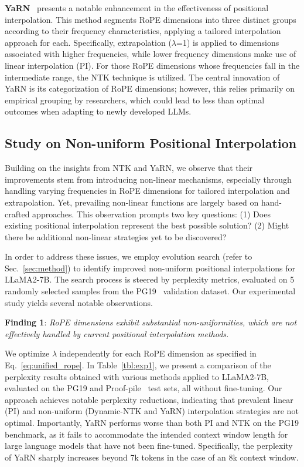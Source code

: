 \textbf{YaRN}~\cite{yarn} presents a notable enhancement in the effectiveness of positional interpolation. This method segments RoPE dimensions into three distinct groups according to their frequency characteristics, applying a tailored interpolation approach for each. Specifically, extrapolation ($\lambda$=1) is applied to dimensions associated with higher frequencies, while lower frequency dimensions make use of linear interpolation (PI). For those RoPE dimensions whose frequencies fall in the intermediate range, the NTK technique is utilized. The central innovation of YaRN is its categorization of RoPE dimensions; however, this relies primarily on empirical grouping by researchers, which could lead to less than optimal outcomes when adapting to newly developed LLMs.

\subsection{Study on Non-uniform Positional Interpolation}

Building on the insights from NTK and YaRN, we observe that their improvements stem from introducing non-linear mechanisms, especially through handling varying frequencies in RoPE dimensions for tailored interpolation and extrapolation. Yet, prevailing non-linear functions are largely based on hand-crafted approaches. This observation prompts two key questions: (1) Does existing positional interpolation represent the best possible solution? (2) Might there be additional non-linear strategies yet to be discovered?

In order to address these issues, we employ evolution search (refer to Sec.~\ref{sec:method}) to identify improved non-uniform positional interpolations for LLaMA2-7B. The search process is steered by perplexity metrics, evaluated on 5 randomly selected samples from the PG19~\cite{pg19} validation dataset. Our experimental study yields several notable observations.

\textbf{Finding 1}: \textit{RoPE dimensions exhibit substantial non-uniformities, which are not effectively handled by current positional interpolation methods.}

We optimize $\lambda$ independently for each RoPE dimension as specified in Eq.~\ref{eq:unified_rope}. In Table~\ref{tbl:exp1}, we present a comparison of the perplexity results obtained with various methods applied to LLaMA2-7B, evaluated on the PG19 and Proof-pile~\cite{proof-pile} test sets, all without fine-tuning. Our approach achieves notable perplexity reductions, indicating that prevalent linear (PI) and non-uniform (Dynamic-NTK and YaRN) interpolation strategies are not optimal. Importantly, YaRN performs worse than both PI and NTK on the PG19 benchmark, as it fails to accommodate the intended context window length for large language models that have not been fine-tuned. Specifically, the perplexity of YaRN sharply increases beyond 7k tokens in the case of an 8k context window.


